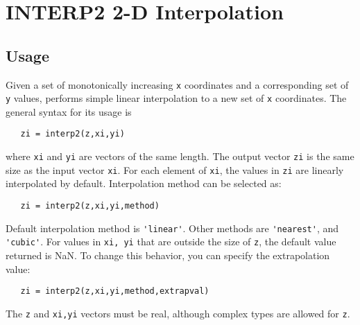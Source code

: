\section{INTERP2 2-D Interpolation}

\subsection{Usage}

Given a set of monotonically increasing \verb|x| coordinates and a 
corresponding set of \verb|y| values, performs simple linear 
interpolation to a new set of \verb|x| coordinates. The general syntax
for its usage is
\begin{verbatim}
   zi = interp2(z,xi,yi)
\end{verbatim}
where \verb|xi| and \verb|yi| are vectors of the same length. The output
vector \verb|zi| is the same size as the input vector \verb|xi|.
For each element of \verb|xi|, the values in \verb|zi| are linearly interpolated
by default. Interpolation method can be selected as:
\begin{verbatim}
   zi = interp2(z,xi,yi,method)
\end{verbatim}
Default interpolation method is \verb|'linear'|. Other methods are
 \verb|'nearest'|, and \verb|'cubic'|.
For values in \verb|xi, yi| that are outside the size of \verb|z|,
the default value returned is NaN.  To change this behavior,
you can specify the extrapolation value:
\begin{verbatim}
   zi = interp2(z,xi,yi,method,extrapval)
\end{verbatim}
The \verb|z| and \verb|xi,yi| vectors must be real, although complex types
are allowed for \verb|z|.
